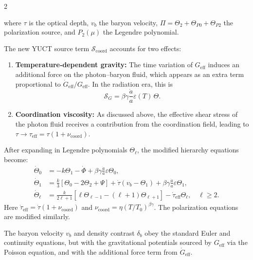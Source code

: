 \documentclass[11pt,a4paper]{article}
\begin{document}
	\begin{multicols}{2}
		
		\noindent where $\tau$ is the optical depth, $v_b$ the baryon velocity, $\Pi = \Theta_2 + \Theta_{P0} + \Theta_{P2}$ the polarization source, and $P_2(\mu)$ the Legendre polynomial.
		
		The new YUCT source term $\mathcal{S}_{\mathrm{coord}}$ accounts for two effects:
		\begin{enumerate}
			\item \textbf{Temperature‑dependent gravity:} The time variation of $G_{\mathrm{eff}}$ induces an additional force on the photon--baryon fluid, which appears as an extra term proportional to $\dot{G}_{\mathrm{eff}}/G_{\mathrm{eff}}$. In the radiation era, this is
			\begin{equation}
				\mathcal{S}_G = \beta\gamma \frac{\dot{a}}{a} \varepsilon(T) \, \Theta.
			\end{equation}
			\item \textbf{Coordination viscosity:} As discussed above, the effective shear stress of the photon fluid receives a contribution from the coordination field, leading to $\tau \to \tau_{\mathrm{eff}} = \tau (1 + \nu_{\mathrm{coord}})$.
		\end{enumerate}
		
		After expanding in Legendre polynomials $\Theta_\ell$, the modified hierarchy equations become:
		\begin{align}
			\dot{\Theta}_0 &= -k\Theta_1 - \dot{\Phi} + \beta\gamma \frac{\dot{a}}{a} \varepsilon \Theta_0, \label{eq:hier0}\\
			\dot{\Theta}_1 &= \frac{k}{3}\left[\Theta_0 - 2\Theta_2 + \Psi\right] + \dot{\tau}(v_b - \Theta_1) + \beta\gamma \frac{\dot{a}}{a} \varepsilon \Theta_1, \label{eq:hier1}\\
			\dot{\Theta}_\ell &= \frac{k}{2\ell+1}\left[\ell\Theta_{\ell-1} - (\ell+1)\Theta_{\ell+1}\right] - \dot{\tau}_{\mathrm{eff}}\Theta_\ell, \quad \ell \ge 2. \label{eq:hier_ell}
		\end{align}
		Here $\dot{\tau}_{\mathrm{eff}} = \dot{\tau}(1 + \nu_{\mathrm{coord}})$ and $\nu_{\mathrm{coord}} = \eta (T/T_0)^{\beta\gamma}$. The polarization equations are modified similarly.
		
		The baryon velocity $v_b$ and density contrast $\delta_b$ obey the standard Euler and continuity equations, but with the gravitational potentials sourced by $G_{\mathrm{eff}}$ via the Poisson equation, and with the additional force term from $\dot{G}_{\mathrm{eff}}$.
		

\end{multicols}
\end{document}
